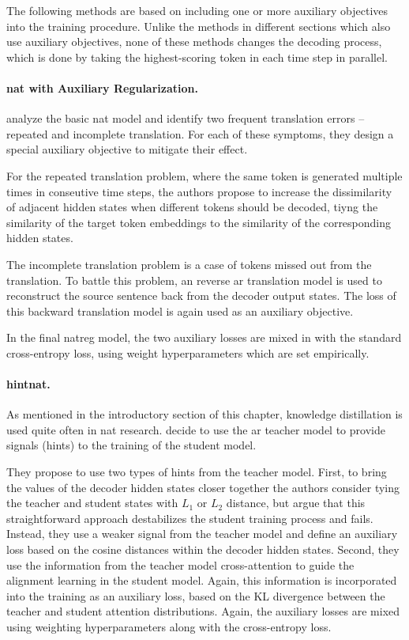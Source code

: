 The following methods are based on including one or more auxiliary objectives
into the training procedure. Unlike the methods in different sections which
also use auxiliary objectives, none of these methods changes the decoding
process, which is done by taking the highest-scoring token in each time step in
parallel.

\paragraph{\Ac{nat} with Auxiliary Regularization.}
\citet{wang-etal-2019-nonautoregressive} analyze the basic \ac{nat} model
\citep{gu2017nonautoregressive} and identify two frequent translation errors --
repeated and incomplete translation. For each of these symptoms, they design a
special auxiliary objective to mitigate their effect.

For the repeated translation problem, where the same token is generated
multiple times in conseutive time steps, the authors propose to increase the
dissimilarity of adjacent hidden states when different tokens should be
decoded, tiyng the similarity of the target token embeddings to the similarity
of the corresponding hidden states.

The incomplete translation problem is a case of tokens missed out from the
translation. To battle this problem, an reverse \ac{ar} translation model is
used to reconstruct the source sentence back from the decoder output states.
The loss of this backward translation model is again used as an auxiliary
objective.

In the final \acs{natreg} model, the two auxiliary losses are mixed in with the
standard cross-entropy loss, using weight hyperparameters which are set
empirically.

\paragraph{\Acs{hintnat}.} As mentioned in the introductory section of this
chapter, knowledge distillation is used quite often in \ac{nat}
research. \citet{li-etal-2019-hint} decide to use the \ac{ar} teacher model to
provide signals (hints) to the training of the student model.

They propose to use two types of hints from the teacher model. First, to bring
the values of the decoder hidden states closer together the authors consider
tying the teacher and student states with $L_1$ or $L_2$ distance, but argue
that this straightforward approach destabilizes the student training process
and fails. Instead, they use a weaker signal from the teacher model and define
an auxiliary loss based on the cosine distances within the decoder hidden
states. Second, they use the information from the teacher model cross-attention
to guide the alignment learning in the student model. Again, this information
is incorporated into the training as an auxiliary loss, based on the KL
divergence between the teacher and student attention distributions.  Again, the
auxiliary losses are mixed using weighting hyperparameters along with
the cross-entropy loss.

